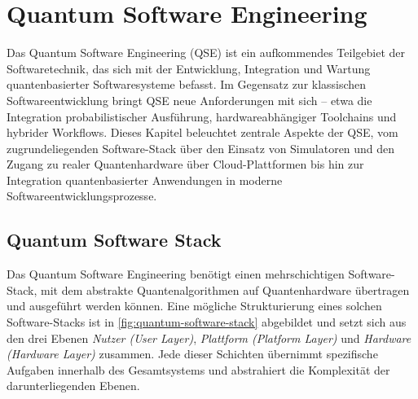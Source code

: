 \section{Quantum Software Engineering}

Das Quantum Software Engineering (QSE) ist ein aufkommendes Teilgebiet der Softwaretechnik, das sich mit der Entwicklung, Integration und Wartung quantenbasierter Softwaresysteme befasst. Im Gegensatz zur klassischen Softwareentwicklung bringt QSE neue Anforderungen mit sich – etwa die Integration probabilistischer Ausführung, hardwareabhängiger Toolchains und hybrider Workflows. \autocite{zhao_quantum-based_2025} Dieses Kapitel beleuchtet zentrale Aspekte der QSE, vom zugrundeliegenden Software-Stack über den Einsatz von Simulatoren und den Zugang zu realer Quantenhardware über Cloud-Plattformen bis hin zur Integration quantenbasierter Anwendungen in moderne Softwareentwicklungsprozesse.

\subsection{Quantum Software Stack}
\label{sec:quantum-software-stack}

Das Quantum Software Engineering benötigt einen mehrschichtigen Software-Stack, mit dem abstrakte Quantenalgorithmen auf Quantenhardware übertragen und ausgeführt werden können. Eine mögliche Strukturierung eines solchen Software-Stacks ist in \autoref{fig:quantum-software-stack} abgebildet und setzt sich aus den drei Ebenen \emph{Nutzer (User Layer)}, \emph{Plattform (Platform Layer)} und \emph{Hardware (Hardware Layer)} zusammen. Jede dieser Schichten übernimmt spezifische Aufgaben innerhalb des Gesamtsystems und abstrahiert die Komplexität der darunterliegenden Ebenen.
\\

